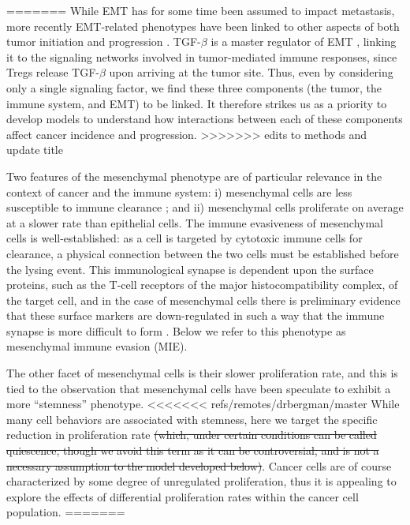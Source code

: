 \documentclass[11pt]{article}
\newcommand{\tcr} { \textcolor{red} }
\begin{document}
=======
While EMT has for some time been assumed to impact metastasis, more recently EMT-related phenotypes have been linked to other aspects of both tumor initiation and progression \cite{nieto2016emt}.  TGF-$\beta$ is a master regulator of EMT \cite{lim2012epithelial}, linking it to the signaling networks involved in tumor-mediated immune responses, since Tregs release TGF-$\beta$ upon arriving at the tumor site\cite{terry2017new}. Thus, even by considering only a single signaling factor, we find these three components (the tumor, the immune system, and EMT) to be linked. It therefore strikes us as a priority to develop models to understand how interactions between each of these components affect cancer incidence and progression.
>>>>>>> edits to methods and update title
\par
Two features of the mesenchymal phenotype are of particular relevance in the context of cancer and the immune system: i) mesenchymal cells are less susceptible to immune clearance \cite{terry2017new}; and ii) mesenchymal cells proliferate on average at a slower rate than epithelial cells.
The immune evasiveness of mesenchymal cells is well-established: as a cell is targeted by cytotoxic immune cells for clearance, a physical connection between the two cells must be established before the lysing event.
This immunological synapse is dependent upon the surface proteins, such as the T-cell receptors of the major histocompatibility complex, of the target cell, and in the case of mesenchymal cells there is preliminary evidence that these surface markers are down-regulated in such a way that the immune synapse is more difficult to form \cite{terry2017new}.
Below we refer to this phenotype as mesenchymal immune evasion (MIE).
\par
The other facet of mesenchymal cells is their slower proliferation rate, and this is tied to the observation that mesenchymal cells have been speculate to exhibit a more ``stemness'' phenotype.
<<<<<<< refs/remotes/drbergman/master
While many cell behaviors are associated with stemness, here we target the specific reduction in proliferation rate \cite{woods2014effects} \sout{(which, under certain conditions can be called quiescence, though we avoid this term as it can be controversial, and is not a necessary assumption to the model developed below)}.
Cancer cells are of course characterized by some degree of unregulated proliferation, thus it is appealing to explore the effects of differential proliferation rates within the cancer cell population.
=======
\end{document}
